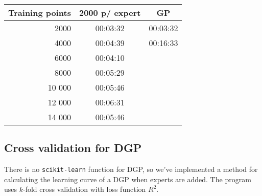 \documentclass[twoside,english]{uiofysmaster}
\begin{document}
\begin{table}
\centering
\begin{tabular}{r|c|c}
Training points & 2000 p/ expert & GP\\
\hline
2000 & 00:03:32 & 00:03:32\\
4000 & 00:04:39 & 00:16:33\\
6000 & 00:04:10\\
8000 & 00:05:29\\
10 000 & 00:05:46\\
12 000 & 00:06:31\\
14 000 & 00:05:46\\
\end{tabular}
\end{table}

\subsection{Cross validation for DGP}

There is no \verb|scikit-learn| function for DGP, so we've implemented a method for calculating the learning curve of a DGP when experts are added. The program uses $k$-fold cross validation with loss function $R^2$.




\end{document}
